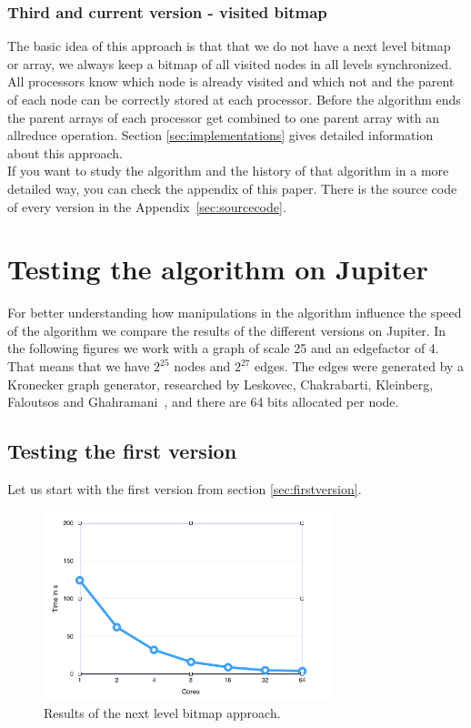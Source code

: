 \documentclass[12pt,a4paper]{article}
\begin{document}
\subsubsection{Third and current version - visited bitmap}
\label{sec:thirdversion}

The basic idea of this approach is that that we do not have a next level bitmap or array, we always keep a bitmap of all visited nodes in all levels synchronized. All processors know which node is already visited and which not and the parent of each node can be correctly stored at each processor. Before the algorithm ends the parent arrays of each processor get combined to one parent array with an allreduce operation. Section \ref{sec:implementations} gives detailed information about this approach.\\
If you want to study the algorithm and the history of that algorithm in a more detailed way, you can check the appendix of this paper. There is the source code of every version in the Appendix~\ref{sec:sourcecode}.

\section{Testing the algorithm on Jupiter}
\label{sec:testing}

For better understanding how manipulations in the algorithm influence the speed of the algorithm we compare the results of the different versions on Jupiter. In the following figures we work with a graph of scale 25 and an edgefactor of 4. That means that we have \(2^{25}\) nodes and \(2^{27}\) edges. The edges were generated by a Kronecker graph generator, researched by Leskovec, Chakrabarti, Kleinberg, Faloutsos and Ghahramani~\cite{kronecker}, and there are 64 bits allocated per node.

\subsection{Testing the first version}

Let us start with the first version from section \ref{sec:firstversion}.

\begin{figure}[!ht]
   \centering
   \includegraphics[width=0.75\textwidth]{next_level}
   \caption{Results of the next level bitmap approach.}
   \label{fig:nextbitmap}
\end{figure}
\end{document}
